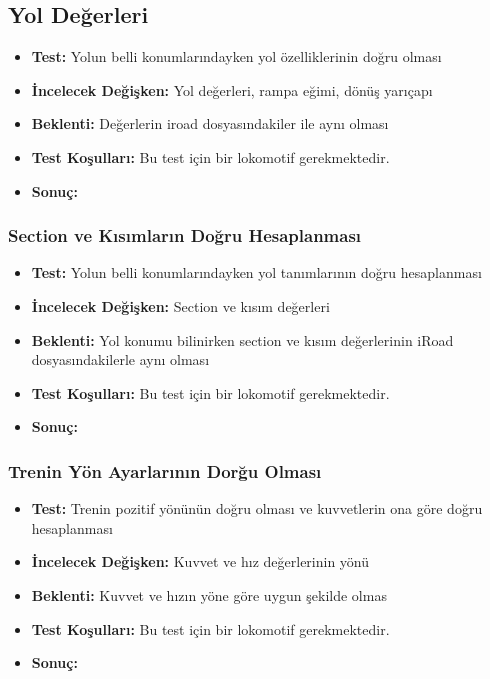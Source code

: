 \documentclass[10pt,a4paper]{article}
\begin{document}
\subsection{Yol Değerleri}
\begin{itemize}
\item \textbf{Test:} Yolun belli konumlarındayken yol özelliklerinin doğru olması\\
\item \textbf{İncelecek Değişken:} Yol değerleri, rampa eğimi, dönüş yarıçapı\\
\item \textbf{Beklenti:}  Değerlerin iroad dosyasındakiler ile aynı olması\\
\item \textbf{Test Koşulları:} Bu test için bir lokomotif gerekmektedir. \\
\item \textbf{Sonuç:}
\end{itemize}

\subsubsection{Section ve Kısımların Doğru Hesaplanması}
\begin{itemize}
\item \textbf{Test:} Yolun belli konumlarındayken yol tanımlarının doğru hesaplanması\\
\item \textbf{İncelecek Değişken:} Section ve kısım değerleri\\
\item \textbf{Beklenti:} Yol konumu bilinirken section ve kısım değerlerinin iRoad dosyasındakilerle aynı olması\\
\item \textbf{Test Koşulları:} Bu test için bir lokomotif gerekmektedir. \\
\item \textbf{Sonuç:}
\end{itemize}


\subsubsection{Trenin Yön Ayarlarının Dorğu Olması}
\begin{itemize}
\item \textbf{Test:} Trenin pozitif yönünün doğru olması ve kuvvetlerin ona göre doğru hesaplanması\\
\item \textbf{İncelecek Değişken:} Kuvvet ve hız değerlerinin yönü\\
\item \textbf{Beklenti:} Kuvvet ve hızın yöne göre uygun şekilde olmas\\
\item \textbf{Test Koşulları:} Bu test için bir lokomotif gerekmektedir. \\
\item \textbf{Sonuç:}
\end{itemize}
\end{document}
